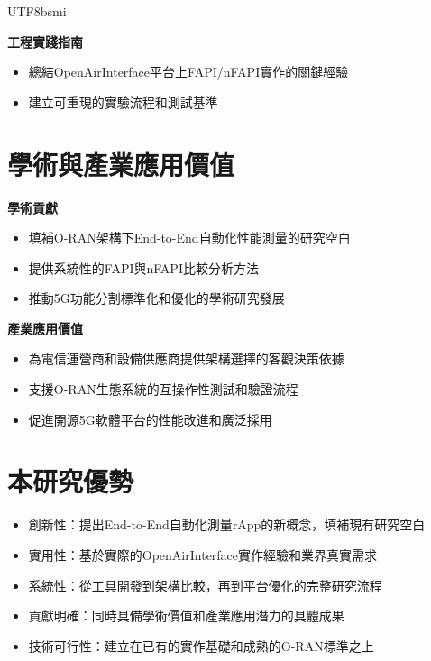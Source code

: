 \documentclass[conference]{IEEEtran}
\begin{document}
\begin{CJK}{UTF8}{bsmi}
{\textbf{工程實踐指南}
\begin{itemize}
    \item 總結OpenAirInterface平台上FAPI/nFAPI實作的關鍵經驗
    \item 建立可重現的實驗流程和測試基準
\end{itemize}

\section{學術與產業應用價值}
\textbf{學術貢獻}
\begin{itemize}
    \item 填補O-RAN架構下End-to-End自動化性能測量的研究空白
    \item 提供系統性的FAPI與nFAPI比較分析方法
    \item 推動5G功能分割標準化和優化的學術研究發展
\end{itemize}

\textbf{產業應用價值}
\begin{itemize}
    \item 為電信運營商和設備供應商提供架構選擇的客觀決策依據
    \item 支援O-RAN生態系統的互操作性測試和驗證流程
    \item 促進開源5G軟體平台的性能改進和廣泛採用
\end{itemize}

\section*{本研究優勢}
\begin{itemize}
    \item 創新性：提出End-to-End自動化測量rApp的新概念，填補現有研究空白
    \item 實用性：基於實際的OpenAirInterface實作經驗和業界真實需求
    \item 系統性：從工具開發到架構比較，再到平台優化的完整研究流程
    \item 貢獻明確：同時具備學術價值和產業應用潛力的具體成果
    \item 技術可行性：建立在已有的實作基礎和成熟的O-RAN標準之上
\end{itemize}
}




\end{CJK}
\end{document}
